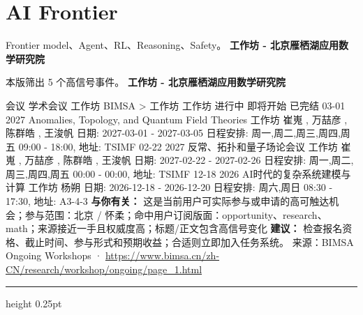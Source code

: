 \documentclass[10.5pt]{ctexart}
\begin{document}
\section*{AI Frontier}
{\color{ormuted} Frontier model、Agent、RL、Reasoning、Safety。}
\vspace{2mm}
{\LARGE\bfseries 工作坊 - 北京雁栖湖应用数学研究院}\par
\vspace{1mm}
{\color{ormuted} 本版筛出 5 个高信号事件。}
\vspace{3mm}
{\Large\bfseries 工作坊 - 北京雁栖湖应用数学研究院}\par
会议 学术会议 工作坊 BIMSA > 工作坊 工作坊 进行中 即将开始 已完结 03-01 2027 Anomalies, Topology, and Quantum Field Theories 工作坊 崔嵬 , 万喆彦 , 陈群皓 , 王浚帆 日期: 2027-03-01 - 2027-03-05 日程安排: 周一,周二,周三,周四,周五 09:00 - 18:00, 地址: TSIMF 02-22 2027 反常、拓扑和量子场论会议 工作坊 崔嵬 , 万喆彦 , 陈群皓 , 王浚帆 日期: 2027-02-22 - 2027-02-26 日程安排: 周一,周二,周三,周四,周五 00:00 - 00:00, 地址: TSIMF 12-18 2026 AI时代的复杂系统建模与计算 工作坊 杨朔 日期: 2026-12-18 - 2026-12-20 日程安排: 周六,周日 08:30 - 17:30, 地址: A3-4-3
\textbf{与你有关：} 这是当前用户可实际参与或申请的高可触达机会；参与范围：北京 / 怀柔；命中用户订阅版面：opportunity、research、math；来源接近一手且权威度高；标题/正文包含高信号变化
\textbf{建议：} 检查报名资格、截止时间、参与形式和预期收益；合适则立即加入任务系统。
{\footnotesize\color{ormuted} 来源：BIMSA Ongoing Workshops · \url{https://www.bimsa.cn/zh-CN/research/workshop/ongoing/page_1.html}}
\vspace{4mm}
\hrule height 0.25pt
\vspace{3mm}
\end{document}
